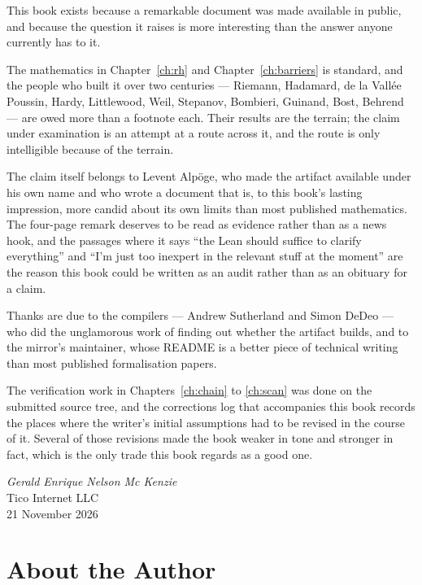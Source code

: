 This book exists because a remarkable document was made available in public,
and because the question it raises is more interesting than the answer anyone
currently has to it.

The mathematics in Chapter~\ref{ch:rh} and Chapter~\ref{ch:barriers} is standard, and the people who
built it over two centuries --- Riemann, Hadamard, de la Vallée Poussin,
Hardy, Littlewood, Weil, Stepanov, Bombieri, Guinand, Bost, Behrend --- are
owed more than a footnote each. Their results are the terrain; the claim under
examination is an attempt at a route across it, and the route is only
intelligible because of the terrain.

The claim itself belongs to Levent Alpöge, who made the artifact available
under his own name and who wrote a document that is, to this book's lasting
impression, more candid about its own limits than most published mathematics.
The four-page remark deserves to be read as evidence rather than as a
news hook, and the passages where it says ``the Lean should suffice to
clarify everything'' and ``I'm just too inexpert in the relevant stuff at the
moment'' are the reason this book could be written as an audit rather than as
an obituary for a claim.

Thanks are due to the compilers --- Andrew Sutherland and Simon DeDeo --- who
did the unglamorous work of finding out whether the artifact builds, and to
the mirror's maintainer, whose README is a better piece of technical writing
than most published formalisation papers.

The verification work in Chapters~\ref{ch:chain} to \ref{ch:scan} was done on the submitted source
tree, and the corrections log that accompanies this book records the places
where the writer's initial assumptions had to be revised in the course of it.
Several of those revisions made the book weaker in tone and stronger in fact,
which is the only trade this book regards as a good one.

\begin{flushright}
\emph{Gerald Enrique Nelson Mc Kenzie}\\
Tico Internet LLC\\
21 November 2026
\end{flushright}

\chapter*{About the Author}
\thispagestyle{plain}

